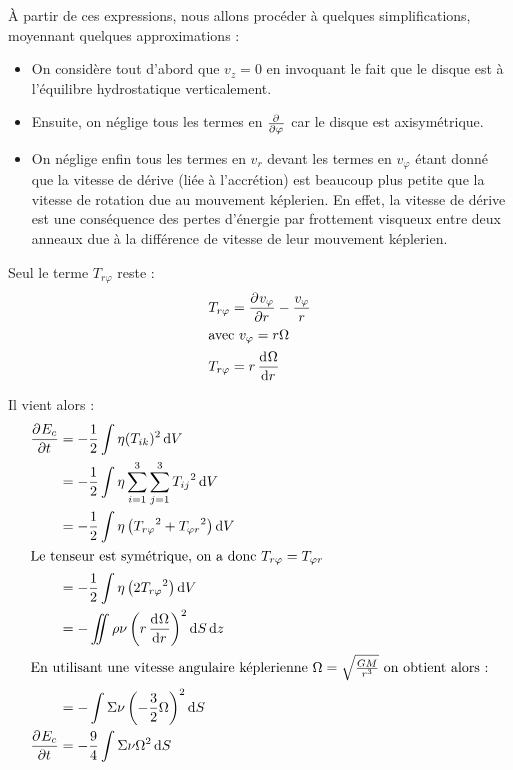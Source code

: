 À partir de ces expressions, nous allons procéder à quelques simplifications, moyennant quelques approximations : 
\begin{itemize}
\item On considère tout d'abord que $v_z=0$ en invoquant le fait que le disque est à l'équilibre hydrostatique verticalement. 

\item Ensuite, on néglige tous les termes en $\pd{}{\varphi}$ car le disque est axisymétrique. 

\item On néglige enfin tous les termes en $v_r$ devant les termes en $v_\varphi$ étant donné que la vitesse de dérive (liée à l'accrétion) est beaucoup plus petite que la vitesse de rotation due au mouvement képlerien. En effet, la vitesse de dérive est une conséquence des pertes d'énergie par frottement visqueux entre deux anneaux due à la différence de vitesse de leur mouvement képlerien.
\end{itemize}




Seul le terme $T_{r\varphi}$ reste :
\begin{align}
T_{r\varphi} &= \dpd{v_\varphi}{r} - \frac{v_\varphi}{r}\nonumber\\
\intertext{avec $v_\varphi=r\Omega$}
T_{r\varphi} &= r\dod{\Omega}{r}
\end{align}

Il vient alors :
\begin{align*}
\dpd{E_c}{t} &= - \frac{1}{2}\int \eta(T_{ik})^2\dif V\\
&= - \frac{1}{2}\int \eta\sum_{i=1}^3\sum_{j=1}^3 {T_{ij}}^2\dif V\\
&= - \frac{1}{2}\int \eta\left({T_{r\varphi}}^2+{T_{\varphi r}}^2\right)\dif V\\
\intertext{Le tenseur est symétrique, on a donc $T_{r\varphi} = T_{\varphi r}$}
&= - \frac{1}{2}\int \eta\left(2{T_{r\varphi}}^2\right)\dif V\\
&= - \iint \rho\nu \left(r\dod{\Omega}{r}\right)^2\dif S\dif z\\
\intertext{En utilisant une vitesse angulaire képlerienne $\Omega=\sqrt{\frac{GM}{r^3}}$ on obtient alors :}
&= - \int \Sigma\nu \left(-\frac{3}{2}\Omega\right)^2\dif S\\
\dpd{E_c}{t} &= - \frac{9}{4} \int \Sigma\nu \Omega^2\dif S
\end{align*}


